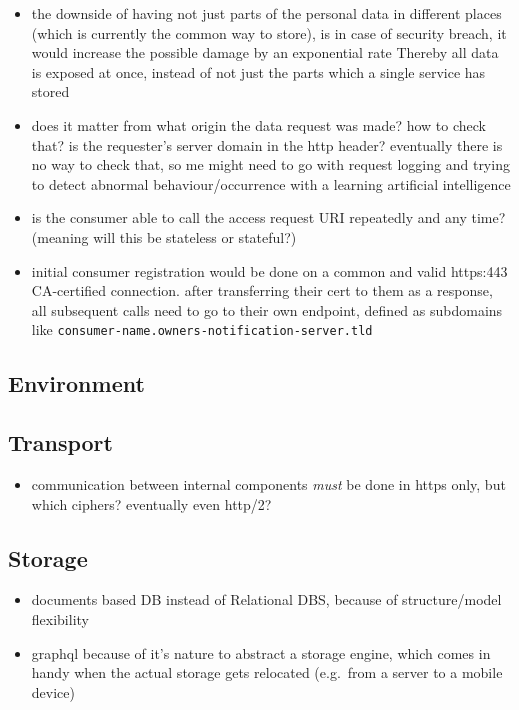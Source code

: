 \documentclass[12pt,english,a4paper,titlepage,cleardoublepage=empty,dottedtoc]{report}
\providecommand{\tightlist}{%
  \setlength{\itemsep}{0pt}\setlength{\parskip}{0pt}}
\begin{document}
\begin{itemize}
\item
  the downside of having not just parts of the personal data in
  different places (which is currently the common way to store), is in
  case of security breach, it would increase the possible damage by an
  exponential rate Thereby all data is exposed at once, instead of not
  just the parts which a single service has stored
\item
  does it matter from what origin the data request was made? how to
  check that? is the requester's server domain in the http header?
  eventually there is no way to check that, so me might need to go with
  request logging and trying to detect abnormal behaviour/occurrence
  with a learning artificial intelligence
\item
  is the consumer able to call the access request URI repeatedly and any
  time? (meaning will this be stateless or stateful?)
\item
  initial consumer registration would be done on a common and valid
  https:443 CA-certified connection. after transferring their cert to
  them as a response, all subsequent calls need to go to their own
  endpoint, defined as subdomains like
  \texttt{consumer-name.owners-notification-server.tld}
\end{itemize}

\subsection{Environment}\label{environment}

\subsection{Transport}\label{transport}

\begin{itemize}
\tightlist
\item
  communication between internal components \emph{must} be done in https
  only, but which ciphers? eventually even http/2?
\end{itemize}

\subsection{Storage}\label{storage}

\begin{itemize}
\tightlist
\item
  documents based DB instead of Relational DBS, because of
  structure/model flexibility
\item
  graphql because of it's nature to abstract a storage engine, which
  comes in handy when the actual storage gets relocated (e.g.~from a
  server to a mobile device)
\end{itemize}
\end{document}
